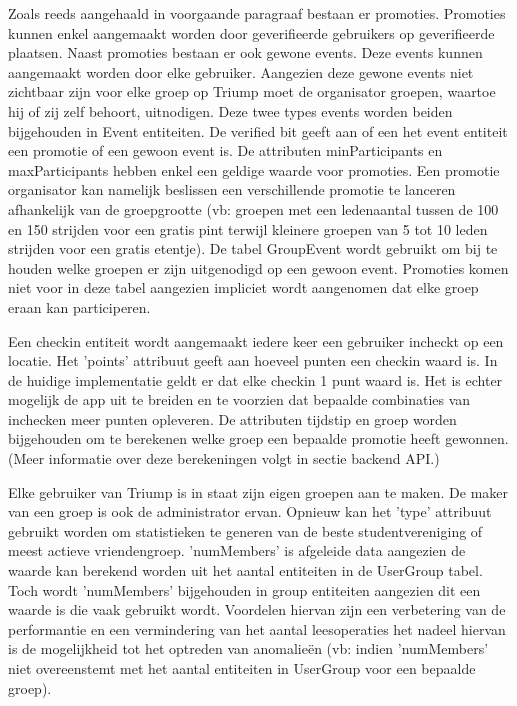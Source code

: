 Zoals reeds aangehaald in voorgaande paragraaf bestaan er promoties. Promoties kunnen enkel aangemaakt worden door geverifieerde gebruikers op geverifieerde plaatsen. Naast promoties bestaan er ook gewone events. Deze events kunnen aangemaakt worden door elke gebruiker. Aangezien deze gewone events niet zichtbaar zijn voor elke groep op Triump moet de organisator groepen, waartoe hij of zij zelf behoort, uitnodigen. 
Deze twee types events worden beiden bijgehouden in Event entiteiten. De verified bit geeft aan of een het event entiteit een promotie of een gewoon event is. De attributen minParticipants en maxParticipants hebben enkel een geldige waarde voor promoties. Een promotie organisator kan namelijk beslissen een verschillende promotie te lanceren afhankelijk van de groepgrootte (vb: groepen met een ledenaantal tussen de 100 en 150 strijden voor een gratis pint terwijl kleinere groepen van 5 tot 10 leden strijden voor een gratis etentje). De tabel GroupEvent wordt gebruikt om bij te houden welke groepen er zijn uitgenodigd op een gewoon event. Promoties komen niet voor in deze tabel aangezien impliciet wordt aangenomen dat elke groep eraan kan participeren.

Een checkin entiteit wordt aangemaakt iedere keer een gebruiker incheckt op een locatie. Het 'points' attribuut geeft aan hoeveel punten een checkin waard is. In de huidige implementatie geldt er dat elke checkin 1 punt waard is. Het is echter mogelijk de app uit te breiden en te voorzien dat bepaalde combinaties van inchecken meer punten opleveren. De attributen tijdstip en groep worden bijgehouden om te berekenen welke groep een bepaalde promotie heeft gewonnen. (Meer informatie over deze berekeningen volgt in sectie backend API.)

Elke gebruiker van Triump is in staat zijn eigen groepen aan te maken. De maker van een groep is ook de administrator ervan. Opnieuw kan het 'type' attribuut gebruikt worden om statistieken te generen van de beste studentvereniging of meest actieve vriendengroep. 'numMembers' is afgeleide data aangezien de waarde kan berekend worden uit het aantal entiteiten in de UserGroup tabel. Toch wordt 'numMembers' bijgehouden in group entiteiten aangezien dit een waarde is die vaak gebruikt wordt. Voordelen hiervan zijn een verbetering van de performantie en een vermindering van het aantal leesoperaties het nadeel hiervan is de mogelijkheid tot het optreden van anomalieën (vb: indien 'numMembers' niet overeenstemt met het aantal entiteiten in UserGroup voor een bepaalde groep).

